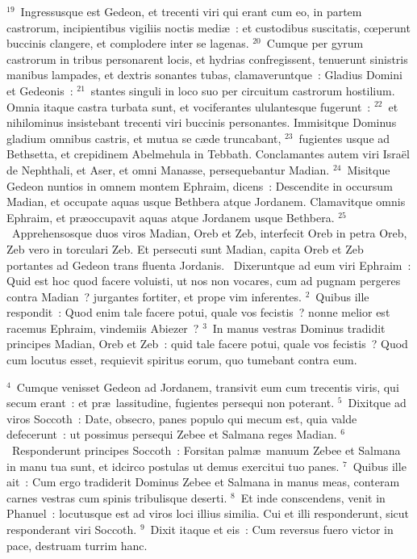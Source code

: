 ${}^{19}$~Ingressusque est Gedeon, et trecenti viri qui erant cum eo, in partem castrorum, incipientibus vigiliis noctis medi\ae~: et custodibus suscitatis, cœperunt buccinis clangere, et complodere inter se lagenas.
${}^{20}$~Cumque per gyrum castrorum in tribus personarent locis, et hydrias confregissent, tenuerunt sinistris manibus lampades, et dextris sonantes tubas, clamaveruntque~: Gladius Domini et Gedeonis~:
${}^{21}$~stantes singuli in loco suo per circuitum castrorum hostilium. Omnia itaque castra turbata sunt, et vociferantes ululantesque fugerunt~:
${}^{22}$~et nihilominus insistebant trecenti viri buccinis personantes. Immisitque Dominus gladium omnibus castris, et mutua se c\ae de truncabant,
${}^{23}$~fugientes usque ad Bethsetta, et crepidinem Abelmehula in Tebbath. Conclamantes autem viri Isra\"el de Nephthali, et Aser, et omni Manasse, persequebantur Madian.
${}^{24}$~Misitque Gedeon nuntios in omnem montem Ephraim, dicens~: Descendite in occursum Madian, et occupate aquas usque Bethbera atque Jordanem. Clamavitque omnis Ephraim, et pr\ae occupavit aquas atque Jordanem usque Bethbera.
${}^{25}$~Apprehensosque duos viros Madian, Oreb et Zeb, interfecit Oreb in petra Oreb, Zeb vero in torculari Zeb. Et persecuti sunt Madian, capita Oreb et Zeb portantes ad Gedeon trans fluenta Jordanis.
~Dixeruntque ad eum viri Ephraim~: Quid est hoc quod facere voluisti, ut nos non vocares, cum ad pugnam pergeres contra Madian~? jurgantes fortiter, et prope vim inferentes.
${}^{2}$~Quibus ille respondit~: Quod enim tale facere potui, quale vos fecistis~? nonne melior est racemus Ephraim, vindemiis Abiezer~?
${}^{3}$~In manus vestras Dominus tradidit principes Madian, Oreb et Zeb~: quid tale facere potui, quale vos fecistis~? Quod cum locutus esset, requievit spiritus eorum, quo tumebant contra eum.


${}^{4}$~Cumque venisset Gedeon ad Jordanem, transivit eum cum trecentis viris, qui secum erant~: et pr\ae\ lassitudine, fugientes persequi non poterant.
${}^{5}$~Dixitque ad viros Soccoth~: Date, obsecro, panes populo qui mecum est, quia valde defecerunt~: ut possimus persequi Zebee et Salmana reges Madian.
${}^{6}$~Responderunt principes Soccoth~: Forsitan palm\ae\ manuum Zebee et Salmana in manu tua sunt, et idcirco postulas ut demus exercitui tuo panes.
${}^{7}$~Quibus ille ait~: Cum ergo tradiderit Dominus Zebee et Salmana in manus meas, conteram carnes vestras cum spinis tribulisque deserti.
${}^{8}$~Et inde conscendens, venit in Phanuel~: locutusque est ad viros loci illius similia. Cui et illi responderunt, sicut responderant viri Soccoth.
${}^{9}$~Dixit itaque et eis~: Cum reversus fuero victor in pace, destruam turrim hanc.


